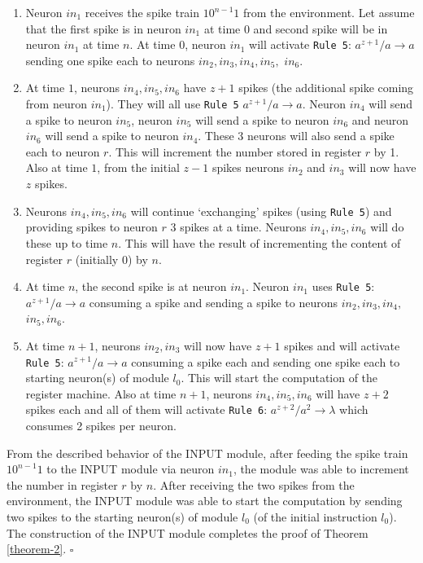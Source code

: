 \documentclass[smallextended]{svjour3}
\begin{document}
\begin{enumerate}
   \item Neuron $in_1$ receives the spike train $10^{n-1}1$ from the environment. Let assume that 
         the first spike is in neuron $in_1$ at time $0$ and second spike will be in neuron $in_1$ 
         at time $n$. At time $0$, neuron $in_1$ will activate \texttt{Rule 5}: $a^{z+1}/a 
         \rightarrow a$  sending one spike each to neurons $in_2, in_3, in_4, in_5,$ $ in_6$.
   \item At time $1$, neurons $in_4, in_5, in_6$ have $z+1$ spikes (the additional spike coming from neuron $in_1$). They will all use 
         \texttt{Rule 5} $a^{z+1}/a \rightarrow a$. Neuron $in_4$ will send a spike to neuron $in_5$, neuron $in_5$ will send a spike to neuron
         $in_6$ and neuron $in_6$ will send a spike to neuron $in_4$. These 3 neurons will also send a spike each to neuron $r$. This will increment
         the number stored in register $r$ by 1. Also at time $1$, from the initial $z-1$ spikes neurons $in_2$ and $in_3$ will now have $z$ spikes.
   \item Neurons $in_4, in_5, in_6$ will continue `exchanging' spikes (using \texttt{Rule 5}) and providing spikes to neuron $r$ 3 spikes at a time.
         Neurons $in_4, in_5, in_6$ will do these up to time $n$. This will have the result of incrementing the content of register $r$ (initially 0)
         by $n$.
   \item At time $n$, the second spike is at neuron $in_1$. Neuron $in_1$ uses \texttt{Rule 5}: $a^{z+1}/a \rightarrow a$ consuming a spike and 
         sending a spike to neurons $in_2,in_3, in_4,$ $in_5, in_6$.
   \item At time $n+1$, neurons $in_2, in_3$ will now have $z+1$ spikes and will activate \texttt{Rule 5}: $a^{z+1}/a \rightarrow a$ consuming a spike 
         each and sending one spike each to starting neuron(s) of module $l_{0}$. This will start the computation of the register machine. Also 
         at time $n+1$, neurons $in_4, in_5, in_6$ will have $z+2$ spikes each and all of them will activate \texttt{Rule 6}: $a^{z+2}/a^2 \rightarrow 
         \lambda$ which consumes 2 spikes per neuron.
\end{enumerate}

From the described behavior of the INPUT module, after feeding the spike train $10^{n-1}1$ to the INPUT module via neuron $in_1$, the module was able
to increment the number in register $r$ by $n$. After receiving the two spikes from the environment, the INPUT module was able to start the 
computation by sending two spikes to the starting neuron(s) of module $l_0$ (of the initial instruction $l_0$). The construction of the INPUT module
completes the proof of Theorem \ref{theorem-2}. $\square$
   
\end{document}
